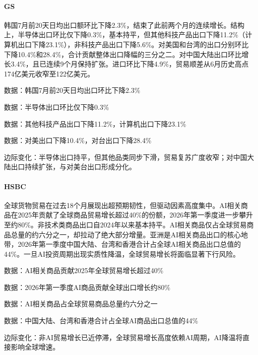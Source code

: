 \documentclass[11pt]{ctexart}
\begin{document}
\paragraph{GS} 韩国7月前20天日均出口额环比下降2.3\%，结束了此前两个月的连续增长。结构上，半导体出口环比仅下降0.3\%，基本持平，但其他科技产品出口下降11.2\%（计算机出口下降23.1\%），非科技产品出口下降5.6\%。对美国和台湾的出口分别环比下降10.4\%和28.4\%，合计贡献整体出口降幅的三分之二。对中国大陆出口环比增长3.4\%，且已连续9个月保持扩张。进口环比下降4.9\%，贸易顺差从6月历史高点174亿美元收窄至122亿美元。
{\small\color{refgray}数据：韩国7月前20天日均出口环比下降2.3\%\par}
{\small\color{refgray}数据：半导体出口环比仅下降0.3\%\par}
{\small\color{refgray}数据：其他科技产品出口下降11.2\%，计算机出口下降23.1\%\par}
{\small\color{refgray}数据：对美出口下降10.4\%，对台出口下降28.4\%\par}
{\small\color{refgray}边际变化：半导体出口持平，但其他品类同步下滑，贸易复苏广度收窄；对中国大陆出口持续扩张，与对美台出口形成分化。\par}
\paragraph{HSBC} 全球货物贸易在过去18个月展现出超预期韧性，但驱动因素高度集中。AI相关商品在2025年贡献了全球商品贸易增长超过40\%的份额，2026年第一季度进一步攀升至约80\%。非技术类商品出口自2024年以来基本持平。AI相关商品仅占全球贸易商品总量的约六分之一，却拉动了绝大部分增量。亚洲是AI相关商品出口的核心地带，2026年第一季度中国大陆、台湾和香港合计占全球AI相关商品出口总值的44\%。一旦AI投资周期出现实质性降温，全球贸易增长将面临显著下行风险。
{\small\color{refgray}数据：AI相关商品贡献2025年全球贸易增长超过40\%\par}
{\small\color{refgray}数据：2026年第一季度AI商品贡献全球出口增长约80\%\par}
{\small\color{refgray}数据：AI相关商品占全球贸易商品总量约六分之一\par}
{\small\color{refgray}数据：中国大陆、台湾和香港合计占全球AI商品出口总值的44\%\par}
{\small\color{refgray}边际变化：非AI贸易增长已近停滞，全球贸易增长高度依赖AI周期，AI降温将直接影响全球增速。\par}
\end{document}
